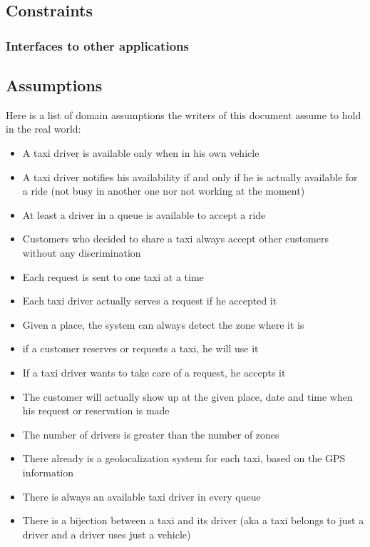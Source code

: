 \pagebreak
\subsection{Constraints}

\subsubsection{Interfaces to other applications}

\subsection{Assumptions}
Here is a list of domain assumptions the writers of this document assume to hold in the real world:
\begin{itemize}
    \item A taxi driver is available only when in his own vehicle 
    \item A taxi driver notifies his availability if and only if he is actually available for a ride (not busy in another one nor not working at the moment)
    \item At least a driver in a queue is available to accept a ride
    \item Customers who decided to share a taxi always accept other customers without any discrimination
    \item Each request is sent to one taxi at a time
    \item Each taxi driver actually serves a request if he accepted it
    \item Given a place, the system can always detect the zone where it is
    \item if a customer reserves or requests a taxi, he will use it
    \item If a taxi driver wants to take care of a request, he accepts it
    \item The customer will actually show up at the given place, date and time when his request or reservation is made
    \item The number of drivers is greater than the number of zones
    \item There already is a geolocalization system for each taxi, based on the GPS information
    \item There is always an available taxi driver in every queue
    \item There is a bijection between a taxi and its driver (aka a taxi belongs to just a driver and a driver uses just a vehicle)
\end{itemize}
